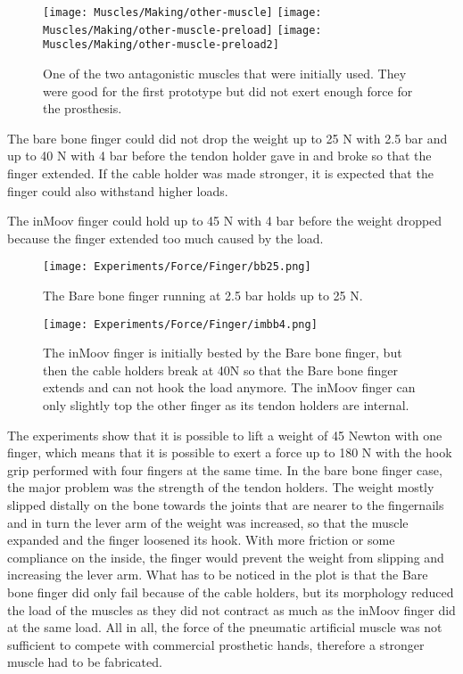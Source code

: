\documentclass[main]{subfiles}
\begin{document}
\begin{figure}[htp]
\centering
\texttt{[image: Muscles/Making/other-muscle]}
\texttt{[image: Muscles/Making/other-muscle-preload]}
\texttt{[image: Muscles/Making/other-muscle-preload2]}
\caption[First version of muscles]{One of the two antagonistic muscles that were initially used. They were good for the first prototype but did not exert enough force for the prosthesis.}
\label{other-muscle}
\end{figure}

The bare bone finger could did not drop the weight up to 25 N with 2.5 bar and up to 40 N with 4 bar before the tendon holder gave in and broke so that the finger extended. If the cable holder was made stronger, it is expected that the finger could also withstand higher loads.

The inMoov finger could hold up to 45 N with 4 bar before the weight dropped because the finger extended too much caused by the load.

\begin{figure}[htp]
\centering
\texttt{[image: Experiments/Force/Finger/bb25.png]}
\caption[Bare bone finger force plot at 2.5 bar]{The Bare bone finger running at 2.5 bar holds up to 25 N.}
\label{bb25}
\end{figure}

\begin{figure}[htp]
\centering
\texttt{[image: Experiments/Force/Finger/imbb4.png]}
\caption[Finger force comparison in inMoov and Bare bone finger]{The inMoov finger is initially bested by the Bare bone finger, but then the cable holders break at 40N so that the Bare bone finger extends and can not hook the load anymore. The inMoov finger can only slightly top the other finger as its tendon holders are internal.}
\label{imbb4}
\end{figure}

The experiments show that it is possible to lift a weight of 45 Newton with one finger, which means that it is possible to exert a force up to 180 N with the hook grip performed with four fingers at the same time. In the bare bone finger case, the major problem was the strength of the tendon holders. The weight mostly slipped distally on the bone towards the joints that are nearer to the fingernails and in turn the lever arm of the weight was increased, so that the muscle expanded and the finger loosened its hook. With more friction or some compliance on the inside, the finger would prevent the weight from slipping and increasing the lever arm. What has to be noticed in the plot is that the Bare bone finger did only fail because of the cable holders, but its morphology reduced the load of the muscles as they did not contract as much as the inMoov finger did at the same load. All in all, the force of the pneumatic artificial muscle was not sufficient to compete with commercial prosthetic hands, therefore a stronger muscle had to be fabricated.
\end{document}
